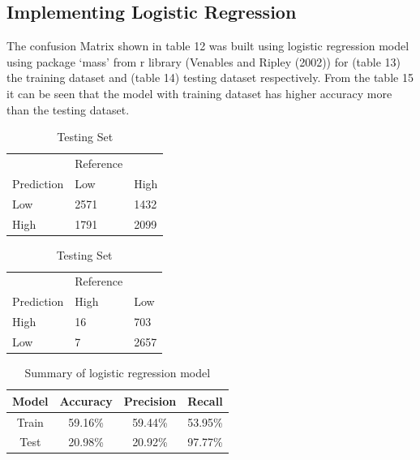 \documentclass[
  a4paper,
]{article}
\begin{document}
\newpage

\hypertarget{implementing-logistic-regression}{%
\subsection{Implementing Logistic
Regression}\label{implementing-logistic-regression}}

The confusion Matrix shown in table 12 was built using logistic
regression model using package `mass' from r library (Venables and
Ripley (2002)) for (table 13) the training dataset and (table 14)
testing dataset respectively. From the table 15 it can be seen that the
model with training dataset has higher accuracy more than the testing
dataset.

\begin{table}[!htb]
    \caption{Confusion matrix of logistic regression model}
    \begin{minipage}{.5\linewidth}
      \caption{Training Set}
      \centering
        \begin{tabular}{lll}
        & Reference & \\
         Prediction  & Low & High\\
           Low & 2571 & 1432 \\
          High & 1791 & 2099  \\
        \end{tabular}
    \end{minipage}%
    \begin{minipage}{.5\linewidth}
      \centering
        \caption{Testing Set}
        \begin{tabular}{lll}
          & Reference & \\
          Prediction  & High & Low \\
           High & 16 & 703 \\
            Low & 7 & 2657\\
        \end{tabular}
    \end{minipage} 
\end{table}

\begin{table}[!htb]
\caption{Summary of logistic regression model} 
\centering
\begin{tabular}{c@{\hskip 0.5in}c@{\hskip 0.5in}c@{\hskip 0.5in}c@{\hskip 0.5in}}
\hline\hline
Model & Accuracy & Precision & Recall \\ [0.5ex]
\hline
Train & 59.16\% & 59.44\% & 53.95\% \\ 
Test & 20.98\% & 20.92\% & 97.77\% \\[1ex]
\hline
\end{tabular}
\end{table}
\end{document}
